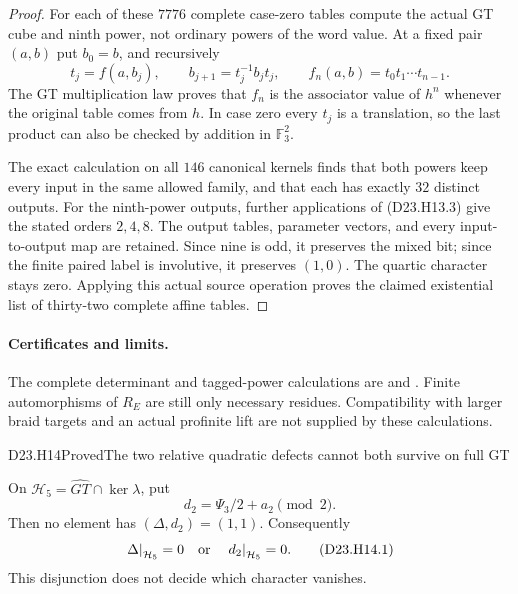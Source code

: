 \begin{proof}
For each of these $7776$ complete case-zero tables compute
the actual GT cube and ninth power, not ordinary powers
of the word value. At a fixed pair $(a,b)$ put $b_0=b$,
and recursively
\[
 t_j=f(a,b_j),\qquad b_{j+1}=t_j^{-1}b_jt_j,
 \qquad f_n(a,b)=t_0t_1\cdots t_{n-1}.
                                                        \tag{D23.H13.3}
\]
The GT multiplication law proves that $f_n$ is the
associator value of $h^n$ whenever the original table
comes from $h$. In case zero every $t_j$ is a translation,
so the last product can also be checked by addition in
$\mathbb F_3^2$.

The exact calculation on all $146$ canonical kernels
finds that both powers keep every input in the same
allowed family, and that each has exactly $32$ distinct
outputs. For the ninth-power outputs, further applications
of (D23.H13.3) give the stated orders $2,4,8$. The output
tables, parameter vectors, and every input-to-output map
are retained. Since nine is odd, it preserves the mixed
bit; since the finite paired label is involutive, it
preserves $(1,0)$. The quartic character stays zero.
Applying this actual source operation proves the claimed
existential list of thirty-two complete affine tables.
\end{proof}

\paragraph{Certificates and limits.}
The complete determinant and tagged-power calculations are
 and
.
Finite automorphisms of $R_E$ are still only necessary
residues. Compatibility with larger braid targets and an
actual profinite lift are not supplied by these calculations.

\begin{statement}{D23.H14}{Proved}{The two relative quadratic defects cannot both survive on full GT}
\end{statement}
On $\mathcal H_5=\widehat{GT}\cap\ker\lambda$, put
\[
             d_2=\Psi_3/2+a_2\pmod2.
\]
Then no element has $(\Delta,d_2)=(1,1)$. Consequently
\[
 \left.\Delta\right|_{\mathcal H_5}=0
       \quad\hbox{or}\quad
 \left.d_2\right|_{\mathcal H_5}=0.
                                                        \tag{D23.H14.1}
\]
This disjunction does not decide which character vanishes.

